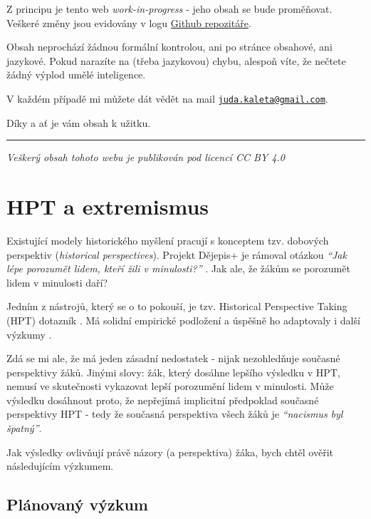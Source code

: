 \documentclass[
  12pt,
  english,
  a4paper,
  extrafontsizes,onecolumn,openright
  ]{memoir}
\begin{document}
Z principu je tento web \emph{work-in-progress} - jeho obsah se bude proměňovat. Veškeré změny jsou evidovány v logu \href{https://github.com/yetty/phd-public}{Github repozitáře}.

Obsah neprochází žádnou formální kontrolou, ani po stránce obsahové, ani jazykové. Pokud narazíte na (třeba jazykovou) chybu, alespoň víte, že nečtete žádný výplod umělé inteligence.

V každém případě mi můžete dát vědět na mail \href{mailto:juda.kaleta@gmail.com}{\nolinkurl{juda.kaleta@gmail.com}}.

Díky a ať je vám obsah k užitku.

\begin{center}\rule{0.5\linewidth}{0.5pt}\end{center}

\emph{Veškerý obsah tohoto webu je publikován pod licencí CC BY 4.0}

\chapter{HPT a extremismus}\label{hpt-a-extremismus}

Existující modely historického myšlení pracují s konceptem tzv. dobových perspektiv (\emph{historical perspectives}). Projekt Dějepis+ je rámoval otázkou \emph{\enquote{Jak lépe porozumět lidem, kteří žili v minulosti?}} \autocite[10]{Cinatl2021Metodika}. Jak ale, že žákům se porozumět lidem v minulosti daří?

Jedním z nástrojů, který se o to pokouší, je tzv. Historical Perspective Taking (HPT) dotazník \autocite{Hartmann_Hasselhorn2008Historical}. Má solidní empirické podložení a úspěšně ho adaptovaly i další výzkumy \autocite{Huijgen_et_al2014Testing,Huijgen_et_al2017Toward}.

Zdá se mi ale, že má jeden zásadní nedostatek - nijak nezohledňuje současné perspektivy žáků. Jinými slovy: žák, který dosáhne lepšího výsledku v HPT, nemusí ve skutečnosti vykazovat lepší porozumění lidem v minulosti. Může výsledku dosáhnout proto, že nepřejímá implicitní předpoklad současné perspektivy HPT - tedy že současná perspektiva všech žáků je \emph{\enquote{nacismus byl špatný}}.

Jak výsledky ovlivňují právě názory (a perspektiva) žáka, bych chtěl ověřit následujícím výzkumem.

\section{Plánovaný výzkum}\label{pluxe1novanuxfd-vuxfdzkum}
\end{document}
